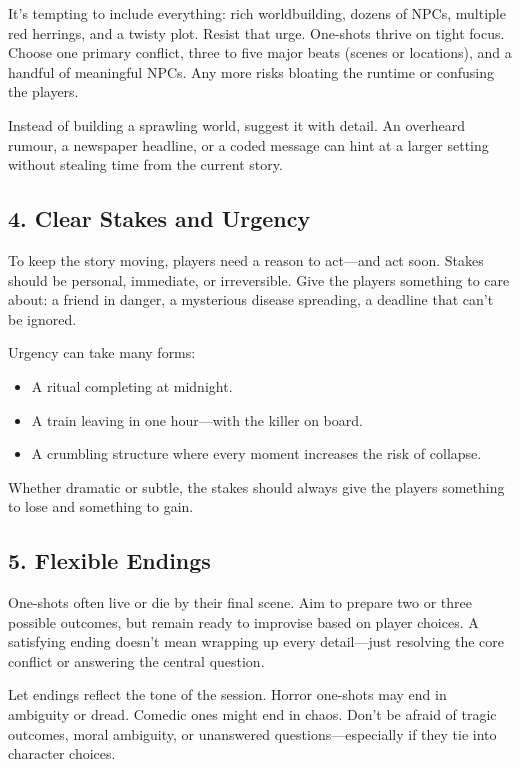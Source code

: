 It’s tempting to include everything: rich worldbuilding, dozens of NPCs, multiple red herrings, and a twisty plot. Resist that urge. One-shots thrive on tight focus. Choose one primary conflict, three to five major beats (scenes or locations), and a handful of meaningful NPCs. Any more risks bloating the runtime or confusing the players.

Instead of building a sprawling world, suggest it with detail. An overheard rumour, a newspaper headline, or a coded message can hint at a larger setting without stealing time from the current story.

\subsection*{4. Clear Stakes and Urgency}

To keep the story moving, players need a reason to act—and act soon. Stakes should be personal, immediate, or irreversible. Give the players something to care about: a friend in danger, a mysterious disease spreading, a deadline that can’t be ignored.

Urgency can take many forms:
\begin{itemize}
    \item A ritual completing at midnight.
    \item A train leaving in one hour—with the killer on board.
    \item A crumbling structure where every moment increases the risk of collapse.
\end{itemize}

Whether dramatic or subtle, the stakes should always give the players something to lose and something to gain.

\subsection*{5. Flexible Endings}

One-shots often live or die by their final scene. Aim to prepare two or three possible outcomes, but remain ready to improvise based on player choices. A satisfying ending doesn’t mean wrapping up every detail—just resolving the core conflict or answering the central question.

Let endings reflect the tone of the session. Horror one-shots may end in ambiguity or dread. Comedic ones might end in chaos. Don’t be afraid of tragic outcomes, moral ambiguity, or unanswered questions—especially if they tie into character choices.

